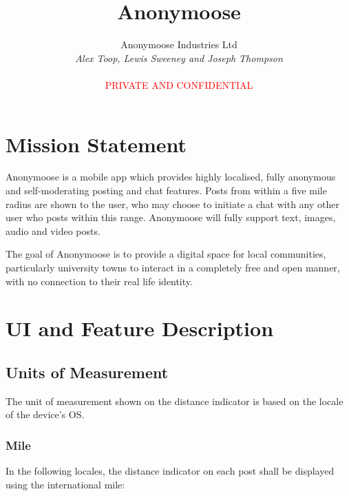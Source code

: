 \documentclass[12pt, a4paper]{article}
\begin{document}
\title{\textbf{Anonymoose}}
\author{Anonymoose Industries Ltd \\ \textit{Alex Toop, Lewis Sweeney and Joseph Thompson} \\ \\ \textcolor{red}{PRIVATE AND CONFIDENTIAL}}
\date{}
\maketitle

\tableofcontents
\clearpage

\section{Mission Statement}
Anonymoose is a mobile app which provides highly localised, fully anonymous and self-moderating posting and chat features. Posts from within a five mile radius are shown to the user, who may choose to initiate a chat with any other user who posts within this range. Anonymoose will fully support text, images, audio and video posts.

The goal of Anonymoose is to provide a digital space for local communities, particularly university towns to interact in a completely free and open manner, with no connection to their real life identity.
\clearpage
\section{UI and Feature Description}
\subsection{Units of Measurement}
The unit of measurement shown on the distance indicator is based on the locale of the device's OS.
\subsubsection{Mile}
In the following locales, the distance indicator on each post shall be displayed using the international mile:
\end{document}
